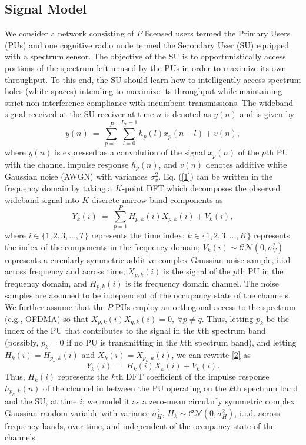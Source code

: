 \documentclass[10pt,twocolumn]{IEEEtran}
\begin{document}
\subsection{Signal Model}\label{A}
We consider a network consisting of $P$ licensed users termed the Primary Users (PUs) and one cognitive radio node termed the Secondary User (SU) equipped with a spectrum sensor. The objective of the SU is to opportunistically access portions of the spectrum left unused by the PUs in order to maximize its own throughput. To this end, the SU should learn how to intelligently access spectrum holes (white-spaces) intending to maximize its throughput while maintaining strict non-interference compliance with incumbent transmissions.
The wideband signal received at the SU receiver at time $n$ is denoted as $y(n)$ and is given by 
\begin{equation}\label{1}
    y(n)\ =\ \sum_{p=1}^{P}\sum_{l=0}^{L_{p}-1} h_{p}(l)x_{p}(n-l) + v(n),
\end{equation}
where $y(n)$ is expressed as a convolution of the signal $x_{p}(n)$ of the $p$th PU with the channel impulse response $h_{p}(n)$, and $v(n)$ denotes additive white Gaussian noise (AWGN) with variances $\sigma_v^2$. Eq. (\ref{1}) can be written in the frequency domain by taking a $K$-point DFT which decomposes the observed wideband signal into $K$ discrete narrow-band components as 
\begin{equation}\label{2}
    Y_k(i)\ =\ \sum_{p=1}^{P}H_{p,k}(i)X_{p,k}(i)+V_k(i),
\end{equation}
where $i \in \{1,2,3,\dots,T\}$ represents the time index; $k \in \{1,2,3,\dots,K\}$ represents the index of the components in the frequency domain; $V_k(i) \sim \mathcal{CN}(0,\sigma_V^2)$ represents a circularly symmetric additive complex Gaussian noise sample, i.i.d across frequency and across time; $X_{p,k}(i)$ is the signal of the $p$th PU in the frequency domain, and $H_{p,k}(i)$ is its frequency domain channel. The noise samples are assumed to be independent of the occupancy state of the channels. We further assume that the $P$ PUs employ an orthogonal access to the spectrum (e.g., OFDMA) so that $X_{p,k}(i)X_{q,k}(i)=0,\ \forall p\neq q$. Thus, letting $p_k$ be the index of the PU that contributes to the signal in the $k$th spectrum band (possibly, $p_k=0$ if no PU is transmitting in the $k$th spectrum band), and letting  $H_{k}(i)=H_{p_k,k}(i)$ and $X_{k}(i)=X_{p_k,k}(i)$, we can rewrite \eqref{2} as 
\begin{equation}\label{3}
    Y_k(i)\ =\ H_{k}(i)X_{k}(i) + V_k(i).
\end{equation}
Thus, $H_k(i)$ represents the $k$th DFT coefficient of the impulse response $h_{p_k,k}(n)$ of the channel in between the PU operating on the $k$th spectrum band and the SU, at time $i$; we model it as a zero-mean circularly symmetric complex Gaussian random variable with variance $\sigma_H^2$, $H_k \sim \mathcal{CN}(0,\sigma_H^2)$, i.i.d. across frequency bands, over time, and independent of the occupancy state of the channels.
\end{document}
